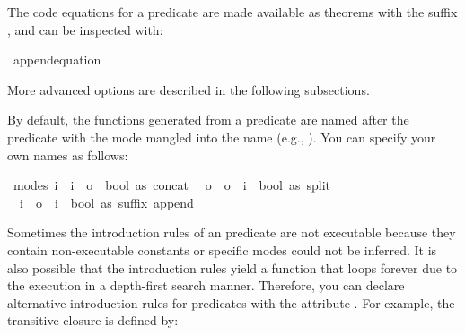\begin{isabellebody}
\begin{isamarkuptext}
  The code equations for a predicate are made available as theorems with
  the suffix , and can be inspected with:%
\end{isamarkuptext}%
\isamarkuptrue%
%
\isadelimquote
%
\endisadelimquote
%
\isatagquote
{}\isamarkupfalse%
\ append{\isachardot}equation%
\endisatagquote
{\isafoldquote}%
%
\isadelimquote
%
\endisadelimquote
%
\begin{isamarkuptext}%
\noindent More advanced options are described in the following subsections.%
\end{isamarkuptext}%
\isamarkuptrue%
%
\isamarkuptrue%
%
\begin{isamarkuptext}%
By default, the functions generated from a predicate are named after
  the predicate with the mode mangled into the name (e.g., ).  You can specify your own names as follows:%
\end{isamarkuptext}%
\isamarkuptrue%
%
\isadelimquote
%
\endisadelimquote
%
\isatagquote
{}\isamarkupfalse%
\ {\isacharparenleft}modes{\isacharcolon}\ i\ {\isacharequal}{\isachargreater}\ i\ {\isacharequal}{\isachargreater}\ o\ {\isacharequal}{\isachargreater}\ bool\ as\ concat{\isacharcomma}\isanewline
\ \ o\ {\isacharequal}{\isachargreater}\ o\ {\isacharequal}{\isachargreater}\ i\ {\isacharequal}{\isachargreater}\ bool\ as\ split{\isacharcomma}\isanewline
\ \ i\ {\isacharequal}{\isachargreater}\ o\ {\isacharequal}{\isachargreater}\ i\ {\isacharequal}{\isachargreater}\ bool\ as\ suffix{\isacharparenright}\ append\ \isacommand{{\isachardot}}\isamarkupfalse%
%
\endisatagquote
{\isafoldquote}%
%
\isadelimquote
%
\endisadelimquote
%
\isamarkuptrue%
%
\begin{isamarkuptext}%
Sometimes the introduction rules of an predicate are not executable
  because they contain non-executable constants or specific modes
  could not be inferred.  It is also possible that the introduction
  rules yield a function that loops forever due to the execution in a
  depth-first search manner.  Therefore, you can declare alternative
  introduction rules for predicates with the attribute \hyperlink{attribute.code-pred-intro}{\mbox{}}.  For example, the transitive closure is defined
  by:%
\end{isamarkuptext}%
\isamarkuptrue%
%
\isadelimquote

\end{isabellebody}
